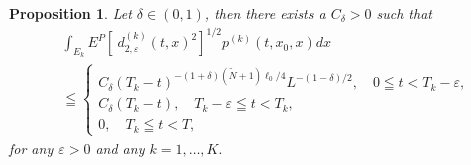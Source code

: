 \documentclass[12pt]{article}
\newtheorem{prop}[thm]{Proposition}%
\begin{document}
\begin{prop}\label{d2}
Let $\delta \in (0,1)$, then there exists a $C_{\delta} > 0$ such that
\begin{align*}
& \int_{E_k} E^P[\ d_{2,\varepsilon}^{(k)}(t,x)^2]^{1/2} p^{(k)}(t, x_0, x)dx\\
&\leqq 
\begin{cases}
C_{\delta}(T_k-t)^{-(1+\delta)(\tilde{N}+1)\ell_0/4}L^{-(1-\delta)/2}, \quad 0 \leqq t <T_k- \varepsilon, \\
C_{\delta} (T_k-t), \quad T_k - \varepsilon \leqq t < T_k, \\
0, \quad T_k \leqq t < T,
\end{cases}
\end{align*}
for any $\varepsilon >0$ and any $k=1,\ldots,K.$
\end{prop}
\end{document}
